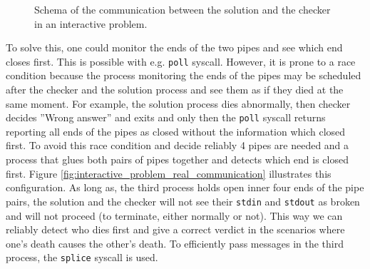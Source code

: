 \documentclass[en]{pracamgr}
\begin{document}
\begin{figure}[h]
\tikzset{>=latex} %
\centering
{}
\caption{Schema of the communication between the solution and the checker in an interactive problem.}
\label{fig:intaractive_problem_communication_schema}
\end{figure}

To solve this, one could monitor the ends of the two pipes and see which end closes first. This is possible with e.g. \texttt{poll} syscall. However, it is prone to a race condition because the process monitoring the ends of the pipes may be scheduled after the checker and the solution process and see them as if they died at the same moment. For example, the solution process dies abnormally, then checker decides ''Wrong answer'' and exits and only then the \texttt{poll} syscall returns reporting all ends of the pipes as closed without the information which closed first. To avoid this race condition and decide reliably 4 pipes are needed and a process that glues both pairs of pipes together and detects which end is closed first. Figure \ref{fig:interactive_problem_real_communication} illustrates this configuration. As long as, the third process holds open inner four ends of the pipe pairs, the solution and the checker will not see their \texttt{stdin} and \texttt{stdout} as broken and will not proceed (to terminate, either normally or not). This way we can reliably detect who dies first and give a correct verdict in the scenarios where one's death causes the other's death. To efficiently pass messages in the third process, the \texttt{splice} syscall is used.
\end{document}
